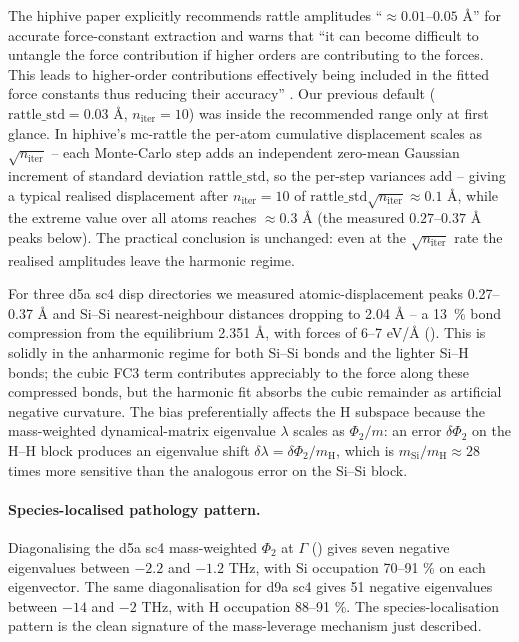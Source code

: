 The hiphive paper explicitly recommends rattle amplitudes
``$\approx 0.01$--$0.05$ Å'' for accurate force-constant extraction
and warns that ``it can become difficult to untangle the force
contribution if higher orders are contributing to the forces.  This
leads to higher-order contributions effectively being included in the
fitted force constants thus reducing their accuracy''
\cite{eriksson_hiphive_2019}.  Our previous default
($\mathrm{rattle\_std}=0.03$ Å, $n_\mathrm{iter}=10$) was inside the
recommended range only at first glance.
In hiphive's mc-rattle the
per-atom cumulative displacement scales as
$\sqrt{n_\mathrm{iter}}$ -- each Monte-Carlo step adds an independent
zero-mean Gaussian increment of standard deviation $\mathrm{rattle\_std}$,
so the per-step variances add -- giving a typical realised displacement
after $n_\mathrm{iter}=10$ of
$\mathrm{rattle\_std}\sqrt{n_\mathrm{iter}} \approx 0.1$ Å, while the
extreme value over all atoms reaches $\approx 0.3$ Å (the measured
$0.27$--$0.37$ Å peaks below).  The practical conclusion is unchanged:
even at the $\sqrt{n_\mathrm{iter}}$ rate the realised amplitudes leave
the harmonic regime.

For three d5a sc4 disp directories we measured atomic-displacement
peaks 0.27--0.37 Å and Si--Si nearest-neighbour distances dropping to
2.04 Å -- a 13~\% bond compression from the equilibrium 2.351 Å, with
forces of 6--7 eV/Å ().  This is
solidly in the anharmonic regime for both Si--Si bonds and the lighter
Si--H bonds; the cubic FC3 term contributes appreciably to the force
along these compressed bonds, but the harmonic fit absorbs the cubic
remainder as artificial negative curvature.  The bias preferentially
affects the H subspace because the mass-weighted dynamical-matrix
eigenvalue $\lambda$ scales as $\Phi_2 / m$: an error
$\delta\Phi_2$ on the H--H block produces an eigenvalue shift
$\delta\lambda = \delta\Phi_2/m_\mathrm{H}$, which is
$m_\mathrm{Si}/m_\mathrm{H} \approx 28$ times more sensitive than the
analogous error on the Si--Si block.

\paragraph{Species-localised pathology pattern.}
Diagonalising the d5a sc4 mass-weighted $\Phi_2$ at $\Gamma$
() gives seven negative eigenvalues
between $-2.2$ and $-1.2$ THz, with Si occupation 70--91 \% on each
eigenvector.  The same diagonalisation for d9a sc4 gives 51 negative
eigenvalues between $-14$ and $-2$ THz, with H occupation 88--91 \%.
The species-localisation pattern is the clean signature of the
mass-leverage mechanism just described.

